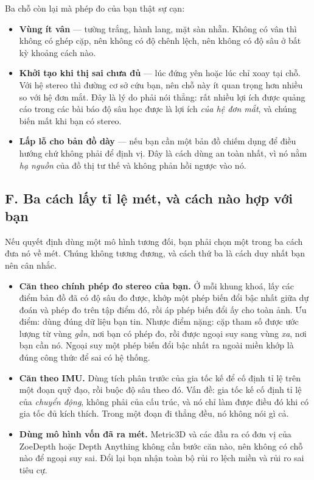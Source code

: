 \documentclass[../../deep_learning.tex]{subfiles}
\begin{document}
Ba chỗ còn lại mà phép đo của bạn thật sự cạn:
\begin{itemize}
\item \textbf{Vùng ít vân} --- tường trắng, hành lang, mặt sàn nhẵn. Không có vân thì không có ghép cặp, nên không có độ chênh lệch, nên không có độ sâu ở bất kỳ khoảng cách nào.
\item \textbf{Khởi tạo khi thị sai chưa đủ} --- lúc đứng yên hoặc lúc chỉ xoay tại chỗ. Với hệ stereo thì đường cơ sở cứu bạn, nên chỗ này ít quan trọng hơn nhiều so với hệ đơn mắt. Đây là lý do phải nói thẳng: rất nhiều lợi ích được quảng cáo trong các bài báo độ sâu học được là lợi ích \emph{của hệ đơn mắt}, và chúng biến mất khi bạn có stereo.
\item \textbf{Lấp lỗ cho bản đồ dày} --- nếu bạn cần một bản đồ chiếm dụng để điều hướng chứ không phải để định vị. Đây là cách dùng an toàn nhất, vì nó nằm \emph{hạ nguồn} của đồ thị tư thế và không phản hồi ngược vào nó.
\end{itemize}

\subsection{F. Ba cách lấy tỉ lệ mét, và cách nào hợp với bạn}
Nếu quyết định dùng một mô hình tương đối, bạn phải chọn một trong ba cách đưa nó về mét. Chúng không tương đương, và cách thứ ba là cách duy nhất bạn nên cân nhắc.

\begin{itemize}
\item \textbf{Căn theo chính phép đo stereo của bạn.} Ở mỗi khung khoá, lấy các điểm bản đồ đã có độ sâu đo được, khớp một phép biến đổi bậc nhất giữa dự đoán và phép đo trên tập điểm đó, rồi áp phép biến đổi ấy cho toàn ảnh. Ưu điểm: dùng đúng dữ liệu bạn tin. Nhược điểm nặng: cặp tham số được ước lượng từ vùng \emph{gần}, nơi bạn có phép đo, rồi được ngoại suy sang vùng \emph{xa}, nơi bạn cần nó. Ngoại suy một phép biến đổi bậc nhất ra ngoài miền khớp là đúng công thức để sai có hệ thống.
\item \textbf{Căn theo IMU.} Dùng tích phân trước của gia tốc kế để cố định tỉ lệ trên một đoạn quỹ đạo, rồi buộc độ sâu theo đó. Vấn đề: gia tốc kế cố định tỉ lệ của \emph{chuyển động}, không phải của cấu trúc, và nó chỉ làm được điều đó khi có gia tốc đủ kích thích. Trong một đoạn đi thẳng đều, nó không nói gì cả.
\item \textbf{Dùng mô hình vốn đã ra mét.} Metric3D và các đầu ra có đơn vị của ZoeDepth hoặc Depth Anything không cần bước căn nào, nên không có chỗ nào để ngoại suy sai. Đổi lại bạn nhận toàn bộ rủi ro lệch miền và rủi ro sai tiêu cự.
\end{itemize}
\end{document}
